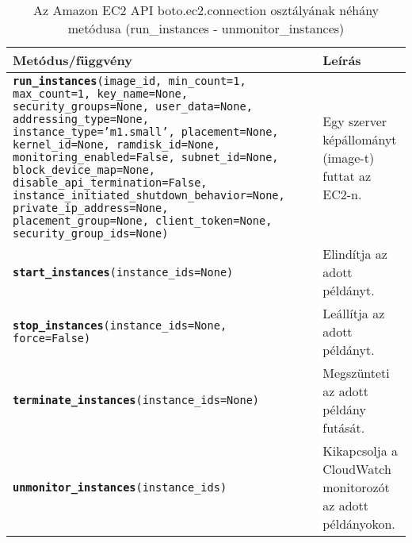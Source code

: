 \begin{table}[h]
	\caption{Az Amazon EC2 API boto.ec2.connection osztályának néhány metódusa (run\_instances - unmonitor\_instances)}
	\centering
	\small
	\begin{tabular}{| p{9.0cm} | p{5.0cm} |}
	    \hline
        \rowcolor{MyTableColor} \textbf{Metódus/függvény} & \textbf{Leírás} \\
	    \hline 
        \texttt{\textbf{run\_instances}(image\_id, min\_count=1, max\_count=1, key\_name=None, security\_groups=None, user\_data=None, addressing\_type=None, instance\_type='m1.small', placement=None, kernel\_id=None, ramdisk\_id=None, monitoring\_enabled=False, subnet\_id=None, block\_device\_map=None, disable\_api\_termination=False, instance\_initiated\_shutdown\_behavior=None, private\_ip\_address=None, placement\_group=None, client\_token=None, security\_group\_ids=None)} & Egy szerver képállományt (image-t) futtat az EC2-n. \\
        \hline
        \texttt{\textbf{start\_instances}(instance\_ids=None)} & Elindítja az adott példányt. \\
        \hline
        \texttt{\textbf{stop\_instances}(instance\_ids=None, force=False)} & Leállítja az adott példányt. \\
        \hline
        \texttt{\textbf{terminate\_instances}(instance\_ids=None)} & Megszünteti az adott példány futását. \\
        \hline
        \texttt{\textbf{unmonitor\_instances}(instance\_ids)} & Kikapcsolja a CloudWatch monitorozót az adott példányokon. \\
        \hline
	\end{tabular}
	\normalsize
	\label{tab:aws_boto_ec2_03}
\end{table}